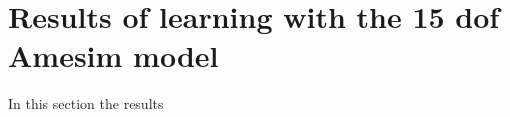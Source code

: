 \chapter{Results of learning with the 15 dof Amesim model}
\label{app:E}
In this section the results 

%
%


